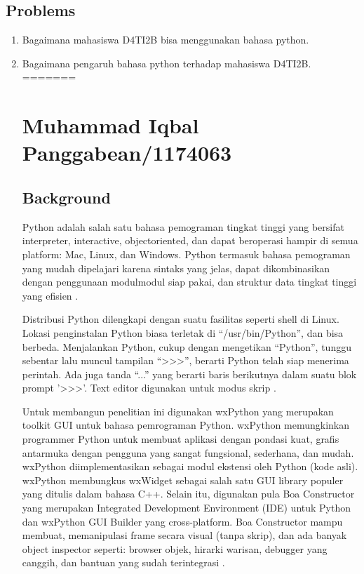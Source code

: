 \subsection{Problems}
	\begin{enumerate}
		\item Bagaimana mahasiswa D4TI2B bisa menggunakan bahasa python.
		\item Bagaimana pengaruh bahasa python terhadap mahasiswa D4TI2B.
=======
\section{Muhammad Iqbal Panggabean/1174063}
\subsection{Background}
	\par 
	Python adalah salah satu bahasa pemograman tingkat tinggi yang bersifat interpreter, interactive, objectoriented, dan dapat beroperasi hampir di semua platform: Mac, Linux, dan Windows. Python termasuk bahasa pemograman yang mudah dipelajari karena sintaks yang jelas, dapat dikombinasikan dengan penggunaan modulmodul siap pakai, dan struktur data tingkat tinggi yang efisien \cite{prasetya2012deteksi}. 
	\par
	Distribusi Python dilengkapi dengan suatu fasilitas seperti shell di Linux. Lokasi penginstalan Python biasa terletak di “/usr/bin/Python”, dan bisa berbeda. Menjalankan Python, cukup dengan mengetikan “Python”, tunggu sebentar lalu muncul tampilan “>>>”, berarti Python telah siap menerima perintah. Ada juga tanda “...” yang berarti baris berikutnya dalam suatu blok prompt '>>>'. Text editor digunakan untuk modus skrip \cite{obrst2003semantic}.
	\par
	Untuk membangun penelitian ini digunakan wxPython yang merupakan toolkit GUI untuk bahasa pemrograman Python. wxPython memungkinkan programmer Python untuk membuat aplikasi dengan pondasi kuat, grafis antarmuka dengan pengguna yang sangat fungsional, sederhana, dan mudah. wxPython diimplementasikan sebagai modul ekstensi oleh Python (kode asli). wxPython membungkus wxWidget sebagai salah satu GUI library populer yang ditulis dalam bahasa C++. Selain itu, digunakan pula Boa Constructor yang merupakan Integrated Development Environment (IDE) untuk Python dan wxPython GUI Builder yang cross-platform. Boa Constructor mampu membuat, memanipulasi frame secara visual (tanpa skrip), dan ada banyak object inspector seperti: browser objek, hirarki warisan, debugger yang canggih, dan bantuan yang sudah terintegrasi \cite{malikhah2016eksplorasi}.
	

\end{enumerate}

